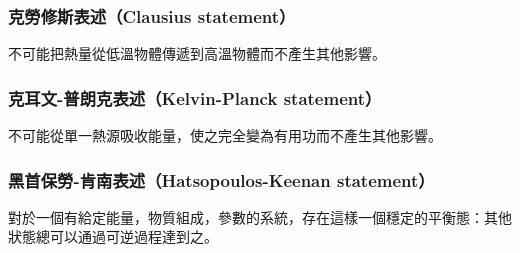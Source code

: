 \documentclass[a4paper,12pt]{report}
\begin{document}
\subsubsection{克勞修斯表述（Clausius statement）}
不可能把熱量從低溫物體傳遞到高溫物體而不產生其他影響。
\subsubsection{克耳文-普朗克表述（Kelvin-Planck statement）}
不可能從單一熱源吸收能量，使之完全變為有用功而不產生其他影響。
\subsubsection{黑首保勞-肯南表述（Hatsopoulos-Keenan statement）}
對於一個有給定能量，物質組成，參數的系統，存在這樣一個穩定的平衡態：其他狀態總可以通過可逆過程達到之。
\end{document}
